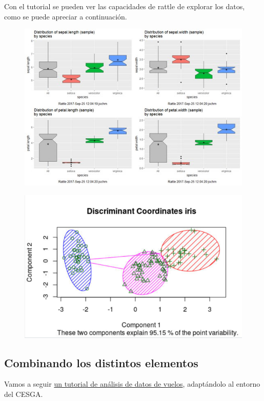 \documentclass[]{book}
\begin{document}
Con el tutorial se pueden ver las capacidades de rattle de explorar los
datos, como se puede apreciar a continuación.

\begin{figure}
\centering
\includegraphics{images/T3-rattle2.png}
\caption{}
\end{figure}

\begin{figure}
\centering
\includegraphics{images/T3-rattle3.png}
\caption{}
\end{figure}

\subsection{Combinando los distintos
elementos}\label{combinando-los-distintos-elementos}

Vamos a seguir
\href{http://hua-zhou.github.io/teaching/biostatm280-2019winter/slides/16-sparklyr/sparklyr-intro.html}{un
tutorial de análisis de datos de vuelos}, adaptándolo al entorno del
CESGA.
\end{document}
